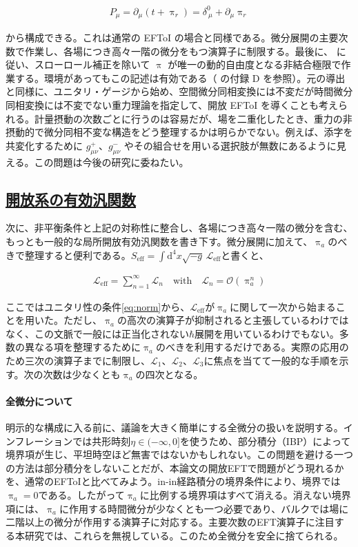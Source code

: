 \documentclass[a4paper,11pt]{ltjsarticle}
\newcommand{\subsectionlink}[1]{\subsection[#1]{\hyperlink{toc}{#1}}}
\numberwithin{equation}{section}
\newcommand{\dd}{\mathrm{d}}
\begin{document}
\begin{align}\label{eq:Pmu}
    P_\mu = \partial_\mu (t + \uppi_{r}) = \delta^0_{~\mu}+ \partial_\mu \uppi_{r}
\end{align}

から構成できる。これは通常の EFToI \cite{Hongo:2018ant} の場合と同様である。微分展開の主要次数で作業し、各場につき高々一階の微分をもつ演算子に制限する。最後に、\cite{LopezNacir:2011kk} に従い、スローロール補正を除いて $\uppi$ が唯一の動的自由度となる非結合極限で作業する。環境があってもこの記述は有効である（\cite{LopezNacir:2011kk} の付録 D を参照）。元の導出 \cite{Cheung:2007st} と同様に、ユニタリ・ゲージから始め、空間微分同相変換には不変だが時間微分同相変換には不変でない重力理論を指定して、開放 EFToI を導くことも考えられる。計量摂動の次数ごとに行うのは容易だが、場を二重化したとき、重力の非摂動的で微分同相不変な構造をどう整理するかは明らかでない。例えば、添字を共変化するために $g^+_{\mu\nu}$、$g^-_{\mu\nu}$ やその組合せを用いる選択肢が無数にあるように見える。この問題は今後の研究に委ねたい。

\subsectionlink{開放系の有効汎関数}

次に、非平衡条件と上記の対称性に整合し、各場につき高々一階の微分を含む、もっとも一般的な局所開放有効汎関数を書き下す。微分展開に加えて、$\uppi_a$のべきで整理すると便利である。$S_{\mathrm{eff}}=\int\dd^4x\sqrt{-g}\,\mathcal{L}_{\mathrm{eff}}$と書くと、

\begin{align}\label{eq:expref}
    \mathcal{L}_{\mathrm{eff}} = \sum_{n=1}^\infty \mathcal{L}_n\quad\mathrm{with}\quad \mathcal{L}_n = \mathcal{O}(\uppi_{a}^n)
\end{align}

ここではユニタリ性の条件\eqref{eq:norm}から、$\mathcal{L}_{\mathrm{eff}}$が$\uppi_a$に関して一次から始まることを用いた。ただし、$\uppi_a$の高次の演算子が抑制されると主張しているわけではなく、この文脈で一般には正当化されない$\hbar$展開を用いているわけでもない\cite{Radovskaya:2020lns}。多数の異なる項を整理するために$\uppi_a$のべきを利用するだけである。実際の応用のため三次の演算子までに制限し、$\mathcal{L}_1$、$\mathcal{L}_2$、$\mathcal{L}_3$に焦点を当てて一般的な手順を示す。次の次数は少なくとも$\uppi_a$の四次となる。

\paragraph{全微分について} 明示的な構成に入る前に、議論を大きく簡単にする全微分の扱いを説明する\cite{Hongo:2018ant}。インフレーションでは共形時刻$\eta\in(-\infty,0]$を使うため、部分積分（IBP）によって境界項が生じ\cite{Salcedo:2022aal,Braglia:2024zsl}、平坦時空ほど無害ではないかもしれない。この問題を避ける一つの方法は部分積分をしないことだが、本論文の開放EFTで問題がどう現れるかを、通常のEFToIと比べてみよう。in-in経路積分の境界条件により、境界では$\uppi_a=0$である。したがって$\uppi_a$に比例する境界項はすべて消える。消えない境界項には、$\uppi_a$に作用する時間微分が少なくとも一つ必要であり、バルクでは場に二階以上の微分が作用する演算子に対応する。主要次数のEFT演算子に注目する本研究では、これらを無視している。このため全微分を安全に捨てられる。
\end{document}
